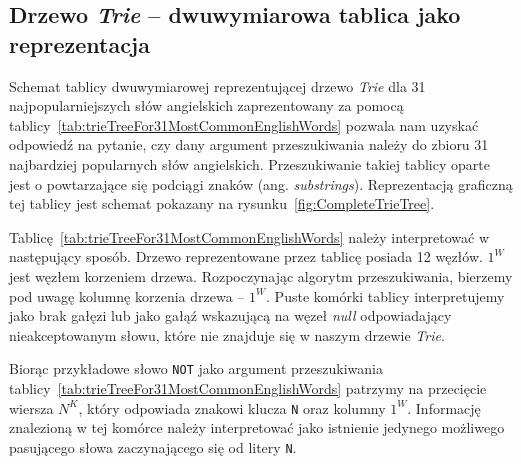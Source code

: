 	\subsection{Drzewo \emph{Trie} -- dwuwymiarowa tablica jako reprezentacja}\label{sec:DrzewoTrieDwuwymiarowaTablicaJakoReprezentacja}
	
        Schemat tablicy dwuwymiarowej reprezentującej drzewo \emph{Trie} dla 31 najpopularniejszych słów angielskich zaprezentowany za pomocą tablicy~\ref{tab:trieTreeFor31MostCommonEnglishWords} pozwala nam uzyskać odpowiedź na pytanie, czy dany argument przeszukiwania należy do zbioru 31 najbardziej popularnych słów angielskich. Przeszukiwanie takiej tablicy oparte jest o powtarzające się podciągi znaków (ang. \emph{substrings}). Reprezentacją graficzną tej tablicy jest schemat pokazany na rysunku~\ref{fig:CompleteTrieTree}.
	
    Tablicę~\ref{tab:trieTreeFor31MostCommonEnglishWords} należy interpretować w następujący sposób. Drzewo reprezentowane przez tablicę posiada 12 węzłów. $1^{W}$ jest węzłem korzeniem drzewa. Rozpoczynając algorytm przeszukiwania, bierzemy pod uwagę kolumnę korzenia drzewa -- $1^{W}$. Puste komórki tablicy interpretujemy jako brak gałęzi lub jako gałąź wskazującą na węzeł \emph{null} odpowiadający nieakceptowanym słowu, które nie znajduje się w naszym drzewie \emph{Trie}.\newline
	
	Biorąc przykładowe słowo \texttt{NOT} jako argument przeszukiwania tablicy~\ref{tab:trieTreeFor31MostCommonEnglishWords} patrzymy na przecięcie wiersza $N^{K}$, który odpowiada znakowi klucza \texttt{N} oraz kolumny $1^{W}$. Informację znalezioną w tej komórce należy interpretować jako istnienie jedynego możliwego pasującego słowa zaczynającego się od litery \texttt{N}.\newline
	
